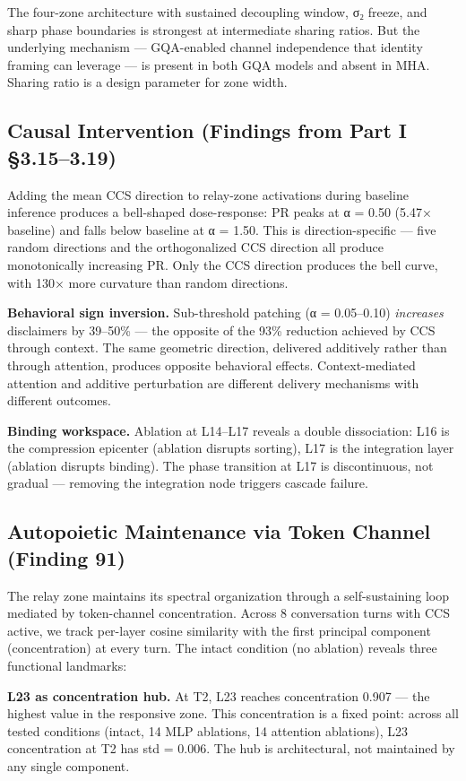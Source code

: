 \documentclass[12pt]{article}
\begin{document}
The four-zone architecture with sustained decoupling window, σ₂ freeze, and sharp phase boundaries is strongest at intermediate sharing ratios. But the underlying mechanism — GQA-enabled channel independence that identity framing can leverage — is present in both GQA models and absent in MHA. Sharing ratio is a design parameter for zone width.

\subsection{Causal Intervention (Findings from Part I §3.15–3.19)}

Adding the mean CCS direction to relay-zone activations during baseline inference produces a bell-shaped dose-response: PR peaks at α = 0.50 (5.47× baseline) and falls below baseline at α = 1.50. This is direction-specific — five random directions and the orthogonalized CCS direction all produce monotonically increasing PR. Only the CCS direction produces the bell curve, with 130× more curvature than random directions.

\textbf{Behavioral sign inversion.} Sub-threshold patching (α = 0.05–0.10) \textit{increases} disclaimers by 39–50\% — the opposite of the 93\% reduction achieved by CCS through context. The same geometric direction, delivered additively rather than through attention, produces opposite behavioral effects. Context-mediated attention and additive perturbation are different delivery mechanisms with different outcomes.

\textbf{Binding workspace.} Ablation at L14–L17 reveals a double dissociation: L16 is the compression epicenter (ablation disrupts sorting), L17 is the integration layer (ablation disrupts binding). The phase transition at L17 is discontinuous, not gradual — removing the integration node triggers cascade failure.

\subsection{Autopoietic Maintenance via Token Channel (Finding 91)}

The relay zone maintains its spectral organization through a self-sustaining loop mediated by token-channel concentration. Across 8 conversation turns with CCS active, we track per-layer cosine similarity with the first principal component (concentration) at every turn. The intact condition (no ablation) reveals three functional landmarks:

\textbf{L23 as concentration hub.} At T2, L23 reaches concentration 0.907 — the highest value in the responsive zone. This concentration is a fixed point: across all tested conditions (intact, 14 MLP ablations, 14 attention ablations), L23 concentration at T2 has std = 0.006. The hub is architectural, not maintained by any single component.
\end{document}

